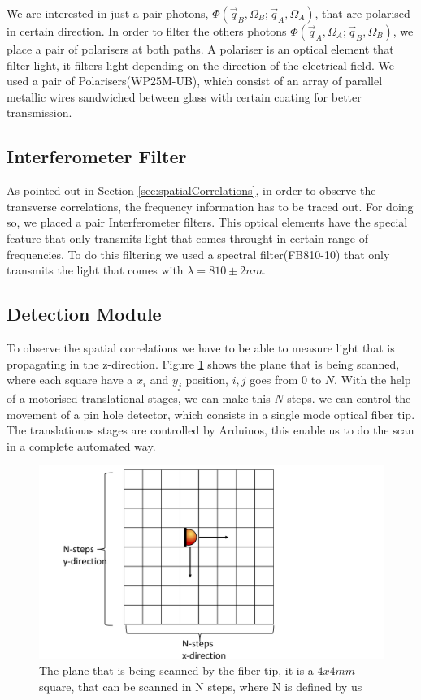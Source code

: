 We are interested in just a pair photons, $\Phi(\vec{q}_B,\Omega_B;\vec{q}_A,\Omega_A)$, that are polarised in certain direction. In order to filter the others
photons $\Phi(\vec{q}_A,\Omega_A;\vec{q}_B,\Omega_B)$, we place a pair of polarisers at both paths. A polariser is an optical element that filter light, it filters
light depending on the direction of the electrical field. We used a pair of Polarisers(WP25M-UB), which consist of an array of parallel metallic
wires sandwiched between glass with certain coating for better transmission.

\subsection{Interferometer Filter}
As pointed out in Section \ref{sec:spatialCorrelations}, in order to observe the transverse
correlations, the frequency information has to be traced out. For doing so, we placed a 
pair Interferometer filters. This optical elements have the special feature that only transmits 
light that comes throught in certain range of frequencies. To do this filtering we used a spectral filter(FB810-10) that only transmits the light that comes
with $\lambda =810 \pm 2nm$.

\subsection{Detection Module}
To observe the spatial correlations we have to be able to measure light that is propagating
in the z-direction. Figure \ref{fig:scan} shows the plane that is being scanned, where each 
square have a $x_i$ and $y_j$ position, ${i,j}$ goes from $0$ to $N$. With the help of a motorised translational stages, we can make this $N$ steps. we can 
control the movement of a pin hole detector, which consists in a single mode optical fiber tip. The translationas stages are controlled 
by Arduinos, this enable us to do the scan in a complete automated way.
\begin{figure}[h!]
\centering
\includegraphics[width=1\textwidth]{Figures/scan.pdf}
\caption{The plane that is being scanned by the fiber tip, it is a $4x4mm$ square, that
can be scanned in N steps, where N is defined by us} 
\label{fig:scan}
\end{figure}

